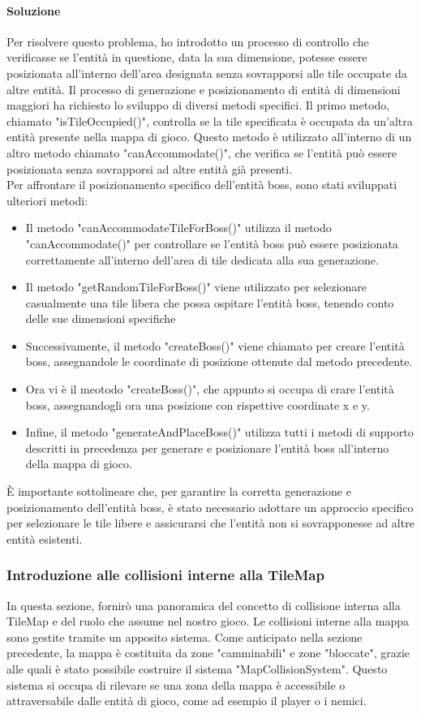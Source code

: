 \documentclass[a4paper,12pt]{report}
\begin{document}
\paragraph*{Soluzione}
Per risolvere questo problema, ho introdotto un processo di controllo che verificasse se l'entità in questione, data la sua dimensione, potesse essere posizionata all'interno dell'area designata senza sovrapporsi alle tile occupate da altre entità.
Il processo di generazione e posizionamento di entità di dimensioni maggiori ha richiesto lo sviluppo di diversi metodi specifici.
Il primo metodo, chiamato "isTileOccupied()", controlla se la tile specificata è occupata da un'altra entità presente nella mappa di gioco.
Questo metodo è utilizzato all'interno di un altro metodo chiamato "canAccommodate()", che verifica se l'entità può essere posizionata senza sovrapporsi ad altre entità già presenti.
\\
Per affrontare il posizionamento specifico dell'entità boss, sono stati sviluppati ulteriori metodi:
\begin{itemize}
	\item Il metodo "canAccommodateTileForBoss()" utilizza il metodo "canAccommodate()" per controllare se l'entità boss può essere posizionata correttamente all'interno dell'area di tile dedicata alla sua generazione.
	\item Il metodo "getRandomTileForBoss()" viene utilizzato per selezionare casualmente una tile libera che possa ospitare l'entità boss, tenendo conto delle sue dimensioni specifiche
	\item Successivamente, il metodo "createBoss()" viene chiamato per creare l'entità boss, assegnandole le coordinate di posizione ottenute dal metodo precedente.
	\item Ora vi è il meotodo "createBoss()", che appunto si occupa di crare l'entità boss, assegnandogli ora una posizione con rispettive coordinate x e y.
	\item Infine, il metodo "generateAndPlaceBoss()" utilizza tutti i metodi di supporto descritti in precedenza per generare e posizionare l'entità boss all'interno della mappa di gioco.
\end{itemize}
È importante sottolineare che, per garantire la corretta generazione e posizionamento dell'entità boss, è stato necessario adottare un approccio specifico per selezionare le tile libere e assicurarsi che l'entità non si sovrapponesse ad altre entità esistenti.
\subsubsection*{Introduzione alle collisioni interne alla TileMap}
In questa sezione, fornirò una panoramica del concetto di collisione interna alla TileMap e del ruolo che assume nel nostro gioco.
Le collisioni interne alla mappa sono gestite tramite un apposito sistema.
Come anticipato nella sezione precedente, la mappa è costituita da zone "camminabili" e zone "bloccate", grazie alle quali è stato possibile costruire il sistema "MapCollisionSystem".
Questo sistema si occupa di rilevare se una zona della mappa è accessibile o attraversabile dalle entità di gioco, come ad esempio il player o i nemici.
\end{document}
